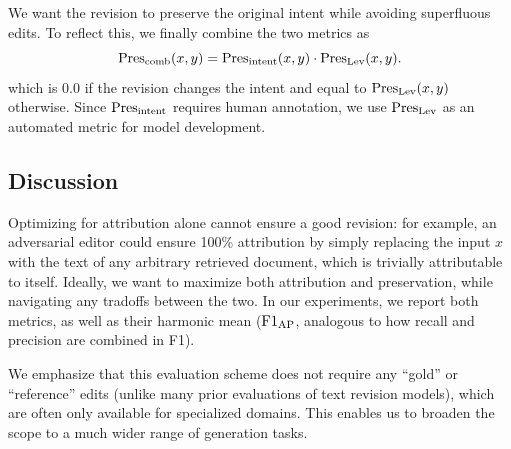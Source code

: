 We want the revision to preserve the original intent while avoiding superfluous edits. To reflect this, we finally combine the two metrics as
\begin{equation}
\text{Pres}_\text{comb}(x, y) = \text{Pres}_\text{intent}(x, y) \cdot \text{Pres}_\text{Lev}(x, y).
\end{equation}
which is 0.0 if the revision changes the intent and equal to $\text{Pres}_\text{Lev}(x, y)$ otherwise.
Since $\text{Pres}_\text{intent}$ requires human annotation,
we use $\text{Pres}_\text{Lev}$ as an automated metric for model development.






\subsection{Discussion}


Optimizing for attribution alone cannot ensure a good revision: for example, an adversarial editor could ensure 100\% attribution by simply replacing the input $x$ with the text of any arbitrary retrieved document, which is trivially attributable to itself.
Ideally, we want to maximize both attribution and preservation, while navigating any tradoffs between the two.
In our experiments, we report both metrics, as well as their harmonic mean ($\text{F1}_\text{AP}{}$, analogous to how recall and precision are combined in F1).


We emphasize that this evaluation scheme does not require any ``gold'' or ``reference'' edits (unlike many prior evaluations of text revision models), which are often only available for specialized domains. This enables us to broaden the scope to a much wider range of generation tasks.
